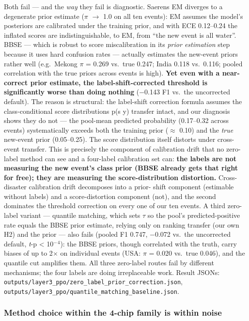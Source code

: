 Both fail --- and the \emph{way} they fail is diagnostic. Saerens EM diverges
to a degenerate prior estimate ($\pi$ $\rightarrow$ 1.0 on all ten events): EM assumes
the model's posteriors are calibrated under the training prior, and with
ECE 0.12--0.24 the inflated scores are indistinguishable, to EM, from ``the
new event is all water''. BBSE --- which is robust to score
miscalibration in its \emph{prior estimation} step because it uses hard
confusion rates --- actually estimates the new-event priors rather well
(e.g.~Mekong $\pi$ = 0.269 vs.~true 0.247; India 0.118 vs.~0.116; pooled
correlation with the true priors across events is high). \textbf{Yet even
with a near-correct prior estimate, the label-shift-corrected threshold
is significantly worse than doing nothing} ($-$0.143 F1 vs.~the
uncorrected default). The reason is structural: the label-shift
correction formula assumes the class-conditional score distributions
p(s \textbar{} y) transfer intact, and our diagnosis shows they do not --- the
pool-mean predicted probability (0.17--0.32 across events) systematically
exceeds both the training prior ($\approx$ 0.10) and the \emph{true} new-event prior
(0.05--0.25). The score distribution itself distorts under cross-event
transfer. This is precisely the component of calibration drift that no
zero-label method can see and a four-label calibration set can: \textbf{the
labels are not measuring the new event's class prior (BBSE already
gets that right for free); they are measuring the score-distribution
distortion.} Cross-disaster calibration drift decomposes into a prior-
shift component (estimable without labels) and a score-distortion
component (not), and the second dominates the threshold correction on
every one of our ten events. A third zero-label variant --- quantile
matching, which sets $\tau$ so the pool's predicted-positive rate equals the
BBSE prior estimate, relying only on ranking transfer (our own H2) and
the prior --- also fails (pooled F1 0.747, $-$0.072 vs.~the uncorrected
default, \emph{t}-p \textless{} 10$^{-}$$^{4}$): the BBSE priors, though correlated with the
truth, carry biases of up to 2$\times$ on individual events (USA: $\pi$ = 0.020
vs.~true 0.046), and the quantile cut amplifies them. All three
zero-label routes fail by different mechanisms; the four labels are
doing irreplaceable work. Result JSONs:
\texttt{outputs/layer3\_ppo/zero\_label\_prior\_correction.json},
\texttt{outputs/layer3\_ppo/quantile\_matching\_baseline.json}.

\subsubsection{Method choice within the 4-chip family is within noise}\label{method-choice-within-the-4-chip-family-is-within-noise}

